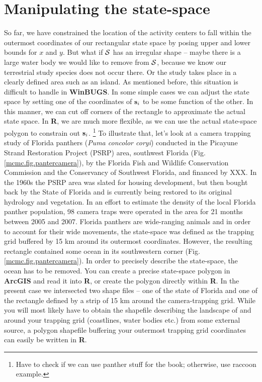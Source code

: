 \section{Manipulating the state-space}
\label{mcmc.sec.state-space}

So far, we have constrained the location of the activity centers to fall
within the outermost coordinates of our rectangular state space by posing 
upper and lower bounds for $x$ and $y$. But what if ${\cal S}$ 
has an irregular 
shape -- maybe there is a large water body we would like to remove from 
${\cal S}$, because we know our terrestrial study species does not occur there.
Or the study takes place in a clearly defined area such as an island. 
As mentioned before, this situation is difficult to handle in {\bf WinBUGS}.
In some simple cases we can adjust the state space by setting one of the
coordinates of ${\bf s}_{i}$ to be some function of the other. 
In this manner, we can cut off corners of the rectangle to approximate 
the actual state space. In {\bf R}, we are much more flexible, as we can 
use the actual state-space polygon to constrain out ${\bf s}_i$. 
\footnote{ Have to check if we can use panther stuff for the book; 
otherwise, use raccoon example.} To illustrate that, let's look at a camera 
trapping study of Florida panthers (\emph{Puma concolor coryi}) conducted 
in the Picayune Strand Restoration Project (PSRP) area, southwest Florida 
(Fig. \ref{mcmc.fig.pantercamera}), by the Florida Fish and Wildlife Conservation Commission and the Conservancy of Southwest Florida, and financed by XXX. In the 1960s 
the PSRP area was slated for housing development, but then bought back by 
the State of Florida and is currently being restored to its original 
hydrology and vegetation. In an effort to estimate the density of the 
local Florida panther population, 98 camera traps were operated in the area 
for 21 months between 2005 and 2007. Florida panthers are wide-ranging 
animals and in order to account for their wide movements, the state-space 
was defined as the trapping grid buffered by 15 km around its outermost 
coordinates. However, the resulting rectangle contained some ocean in its 
southwestern corner (Fig. \ref{mcmc.fig.pantercamera}).
In order to precisely describe the state-space, the ocean has to be 
removed. You can create a precise state-space polygon in {\bf ArcGIS} and 
read it into {\bf R}, or create the polygon directly within {\bf R}. In 
the present case we intersected two shape files -- one of the state of 
Florida and one of the rectangle defined by a strip of 15 km around the
 camera-trapping grid.
While you will most likely have to obtain the shapefile describing the 
landscape of and around your trapping grid (coastlines, water bodies etc.) 
from some external source, a polygon shapefile buffering your outermost 
trapping grid coordinates can easily be written in {\bf R}.


